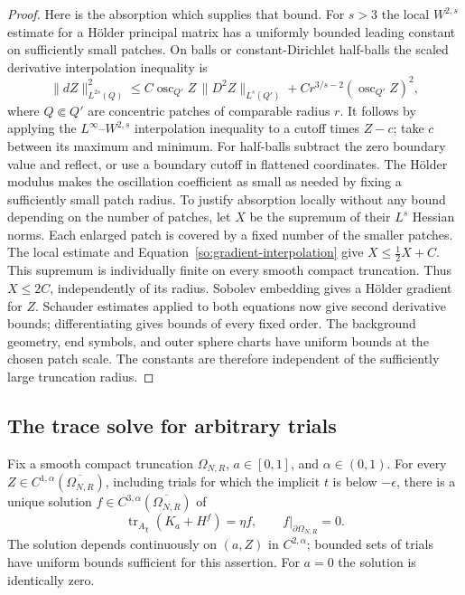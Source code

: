 \begin{proof}
Here is the absorption which supplies that bound.  For $s>3$ the local
$W^{2,s}$ estimate for a H\"older principal matrix has a uniformly
bounded leading constant on sufficiently small patches.  On balls
or constant-Dirichlet half-balls the scaled derivative interpolation
inequality is
\begin{equation}\label{so:gradient-interpolation}
 \|dZ\|_{L^{2s}(Q)}^2
 \le C\operatorname{osc}_{Q'}Z\,
                      \|D^2Z\|_{L^s(Q')}
        +C r^{3/s-2}(\operatorname{osc}_{Q'}Z)^2,
\end{equation}
where $Q\Subset Q'$ are concentric patches of comparable radius $r$.
It follows by applying the $L^\infty$--$W^{2,s}$ interpolation
inequality to a cutoff times $Z-c$; take $c$ between its maximum and
minimum.  For half-balls subtract the zero boundary value and reflect,
or use a boundary cutoff in flattened coordinates.
The H\"older modulus makes the oscillation coefficient as small as
needed by fixing a sufficiently small patch radius.  To justify
absorption locally without any bound depending on the number of
patches, let $X$ be the supremum of their $L^s$ Hessian norms.  Each
enlarged patch is covered by a fixed number of the smaller patches.
The local estimate and Equation~\ref{so:gradient-interpolation} give
$X\le\frac12X+C$.  This supremum is individually finite on every
smooth compact truncation.  Thus $X\le2C$, independently of its
radius.  Sobolev embedding gives a H\"older gradient for $Z$.
Schauder estimates applied to both equations now give second derivative
bounds; differentiating gives bounds of every fixed order.  The
background geometry, end symbols, and outer sphere charts have
uniform bounds at the chosen patch scale.  The constants are
therefore independent of the sufficiently large truncation radius.
\end{proof}

\subsection{The trace solve for arbitrary trials}

\begin{proposition}\label{so:trial-trace}
Fix a smooth compact truncation $\Omega_{N,R}$, $a\in[0,1]$,
and $\alpha\in(0,1)$.
For every $Z\in C^{1,\alpha}(\overline{\Omega_{N,R}})$, including trials
for which the implicit $t$ is below $-\epsilon$, there is a unique
solution $f\in C^{3,\alpha}(\overline{\Omega_{N,R}})$ of
\[
 \operatorname{tr}_{A_\chi}(K_a+H^f)=\eta f,
 \qquad f|_{\partial\Omega_{N,R}}=0.
\]
The solution depends continuously on $(a,Z)$ in $C^{2,\alpha}$; bounded
sets of trials have uniform bounds sufficient for this assertion.
For $a=0$ the solution is identically zero.
\end{proposition}

